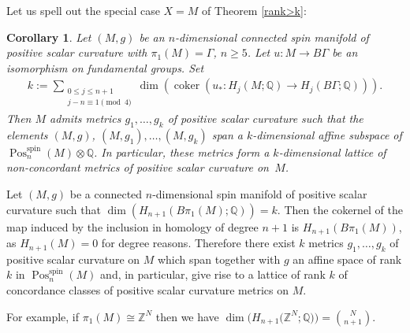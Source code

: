 \documentclass[10pt,a4paper]{amsart}
\numberwithin{equation}{section}
\newtheorem{Corollary}[Theorem]{Corollary}
\newcommand{\integers}{\mathbb{Z}}
\newcommand{\rationals}{\mathbb{Q}}
\newcommand{\tensor}{\otimes}
\newcommand{\iso}{\cong}
\DeclareMathOperator{\Pos}{Pos}
\DeclareMathOperator{\spin}{spin}
\DeclareMathOperator{\coker}{coker}
\begin{document}
Let us spell out the special case $X=M$ of Theorem \ref{rank>k}:
\begin{Corollary}\label{corol:metrics}
 Let $(M,g)$ be an $n$-dimensional connected
 spin manifold
 of positive scalar curvature with $\pi_1(M)=\Gamma$, $n\ge 5$. Let $u\colon M\to
 B\Gamma$ be an isomorphism on fundamental groups. Set
 \begin{gather*}%
 k:=\sum_{ \substack{0\le j\le n+1\\ j-n\equiv 1\pmod 4}} \dim\left(\coker(u_*\colon
 H_j(M;\rationals)\to H_j(B\Gamma;\rationals))\right).
 \end{gather*}
 Then $M$ admits metrics $g_1,\dots,g_k$ of positive scalar curvature such
 that the elements $(M,g)$, $(M,g_1), \dots, (M,g_k)$ span a $k$-dimensional affine
 subspace of $\Pos^{\spin}_n(M)\tensor\rationals$. In particular, these
 metrics form a $k$-dimensional lattice of non-concordant metrics of
 positive scalar curvature on~$M$.
\end{Corollary}

\begin{Example}
 Let $(M,g)$ be a connected $n$-dimensional spin manifold of
 positive scalar curvature such that
 $\dim(H_{n+1}(B\pi_1(M);\rationals))=k$. Then
 the cokernel of the map induced by the inclusion in homology of degree
 $n+1$ is $H_{n+1}(B\pi_1(M))$, as $H_{n+1}(M)=0$ for degree
 reasons. Therefore there exist $k$ metrics $g_1,\dots,g_k$ of
 positive scalar curvature on $M$ which span
 together with $g$ an affine space of rank $k$ in
 $\Pos^{\spin}_n(M)$ and, in particular, give rise to a lattice of
 rank $k$ of concordance classes of positive scalar curvature
 metrics on $M$.

For example, if $\pi_1(M)\iso\integers^N$ then we have
 $\dim\big(H_{n+1}\big(\integers^N;\rationals\big)\big)=\binom{N}{n+1}$.
\end{Example}
\end{document}
